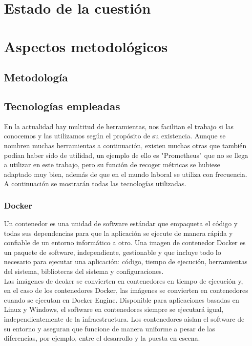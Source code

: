\documentclass[ spanish, a4paper, 12pt, oneside]{report}
\begin{document}
\chapter{Estado de la cuestión}












\chapter{Aspectos metodológicos}

\section{Metodología}

\section{Tecnologías empleadas}
En la actualidad hay multitud de herramientas, nos facilitan el trabajo si las conocemos y las utilizamos según el propósito de su existencia. 
Aunque se nombren muchas herramientas a continuación, existen muchas otras que también podían haber sido de utilidad, un ejemplo de ello es "Prometheus" 
que no se llega a utilizar en este trabajo, pero su función de recoger métricas se hubiese adaptado muy bien, además de que en el mundo laboral se utiliza con 
frecuencia.\\

A continuación se mostrarán todas las tecnologías utilizadas.\\

\subsection{Docker}
Un contenedor es una unidad de software estándar que empaqueta el código y todas sus dependencias para que la aplicación 
se ejecute de manera rápida y confiable de un entorno informático a otro. Una imagen de contenedor Docker es un paquete 
de software, independiente, gestionable y que incluye todo lo necesario para ejecutar una aplicación: código, tiempo 
de ejecución, herramientas del sistema, bibliotecas del sistema y configuraciones.\\

Las imágenes de dcoker se convierten en contenedores en tiempo de ejecución y, en el caso de los contenedores Docker, 
las imágenes se convierten en contenedores cuando se ejecutan en Docker Engine. Disponible para aplicaciones basadas en 
Linux y Windows, el software en contenedores siempre se ejecutará igual, independientemente de la infraestructura. Los 
contenedores aíslan el software de su entorno y aseguran que funcione de manera uniforme a pesar de las diferencias, por 
ejemplo, entre el desarrollo y la puesta en escena.\\
\end{document}
